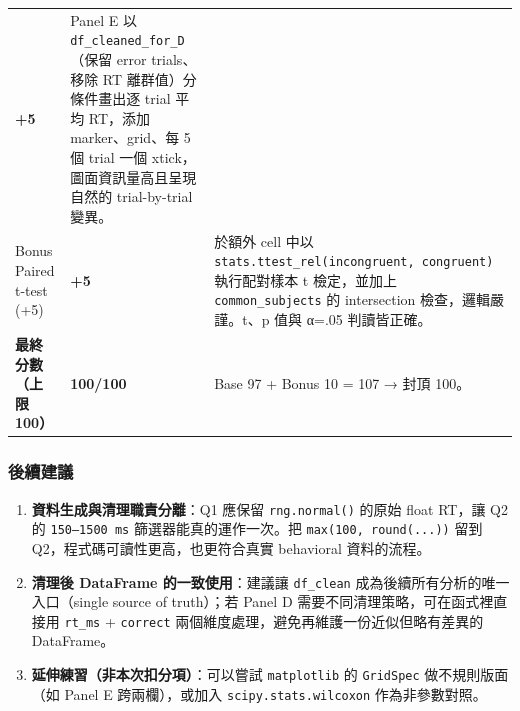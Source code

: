 \documentclass[
  14pt,
]{extarticle}
\providecommand{\tightlist}{%
  \setlength{\itemsep}{0pt}\setlength{\parskip}{0pt}}
\begin{document}
\begin{longtable}[]{@{}lll@{}}
\begin{minipage}[t]{0.04\columnwidth}
\textbf{+5}\strut
\end{minipage} & \begin{minipage}[t]{0.78\columnwidth}\raggedright
Panel E 以 \texttt{df\_cleaned\_for\_D}（保留 error trials、移除 RT
離群值）分條件畫出逐 trial 平均 RT，添加 marker、grid、每 5 個 trial
一個 xtick，圖面資訊量高且呈現自然的 trial-by-trial 變異。\strut
\end{minipage}\tabularnewline
\begin{minipage}[t]{0.10\columnwidth}\raggedright
Bonus Paired t-test (+5)\strut
\end{minipage} & \begin{minipage}[t]{0.04\columnwidth}\raggedright
\textbf{+5}\strut
\end{minipage} & \begin{minipage}[t]{0.78\columnwidth}\raggedright
於額外 cell 中以 \texttt{stats.ttest\_rel(incongruent,\ congruent)}
執行配對樣本 t 檢定，並加上 \texttt{common\_subjects} 的 intersection
檢查，邏輯嚴謹。t、p 值與 α=.05 判讀皆正確。\strut
\end{minipage}\tabularnewline
\begin{minipage}[t]{0.10\columnwidth}\raggedright
\textbf{最終分數（上限 100）}\strut
\end{minipage} & \begin{minipage}[t]{0.04\columnwidth}\raggedright
\textbf{100/100}\strut
\end{minipage} & \begin{minipage}[t]{0.78\columnwidth}\raggedright
Base 97 + Bonus 10 = 107 → 封頂 100。\strut
\end{minipage}\tabularnewline
\bottomrule
\end{longtable}

\hypertarget{ux5f8cux7e8cux5efaux8b70}{%
\subsubsection{後續建議}\label{ux5f8cux7e8cux5efaux8b70}}

\begin{enumerate}
\def\labelenumi{\arabic{enumi}.}
\tightlist
\item
  \textbf{資料生成與清理職責分離}：Q1 應保留 \texttt{rng.normal()}
  的原始 float RT，讓 Q2 的 \texttt{150–1500\ ms}
  篩選器能真的運作一次。把 \texttt{max(100,\ round(...))} 留到
  Q2，程式碼可讀性更高，也更符合真實 behavioral 資料的流程。
\item
  \textbf{清理後 DataFrame 的一致使用}：建議讓 \texttt{df\_clean}
  成為後續所有分析的唯一入口（single source of truth）；若 Panel D
  需要不同清理策略，可在函式裡直接用 \texttt{rt\_ms} + \texttt{correct}
  兩個維度處理，避免再維護一份近似但略有差異的 DataFrame。
\item
  \textbf{延伸練習（非本次扣分項）}：可以嘗試 \texttt{matplotlib} 的
  \texttt{GridSpec} 做不規則版面（如 Panel E 跨兩欄），或加入
  \texttt{scipy.stats.wilcoxon} 作為非參數對照。
\end{enumerate}
\end{document}
